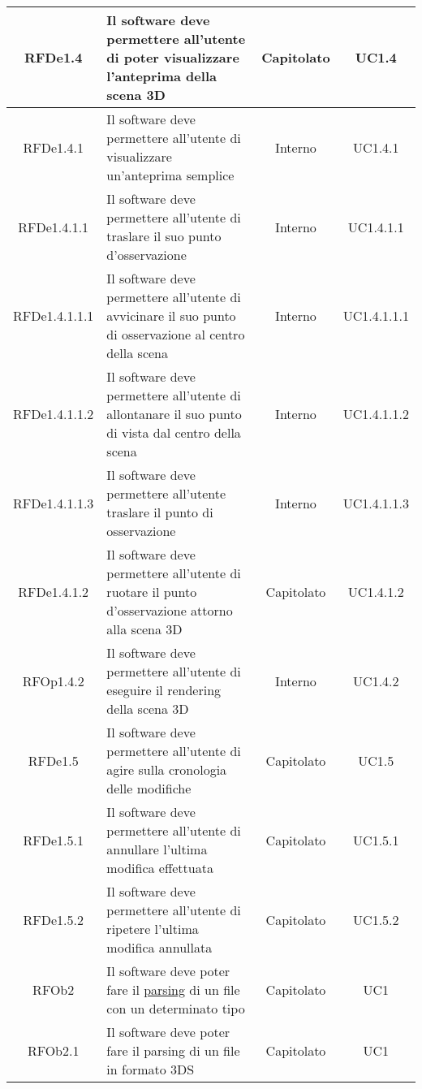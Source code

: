 \begin{longtable}{|c|p{6cm}|c|c|}
\midrule
RFDe1.4
& Il software deve permettere all'utente di poter visualizzare l'anteprima della scena 3D
& Capitolato
& UC1.4
\\


\midrule
RFDe1.4.1
& Il software deve permettere all'utente di visualizzare un'anteprima semplice
& Interno
& UC1.4.1
\\


\midrule
RFDe1.4.1.1
& Il software deve permettere all'utente di traslare il suo punto d'osservazione
& Interno
& UC1.4.1.1
\\


\midrule
RFDe1.4.1.1.1
& Il software deve permettere all'utente di avvicinare il suo punto di osservazione al centro della scena
& Interno
& UC1.4.1.1.1
\\


\midrule
RFDe1.4.1.1.2
& Il software deve permettere all'utente di allontanare il suo punto di vista dal centro della scena
& Interno
& UC1.4.1.1.2
\\


\midrule
RFDe1.4.1.1.3
& Il software deve permettere all'utente traslare il punto di osservazione
& Interno
& UC1.4.1.1.3
\\


\midrule
RFDe1.4.1.2
& Il software deve permettere all'utente di ruotare il punto d'osservazione attorno alla scena 3D
& Capitolato
& UC1.4.1.2
\\


\midrule
RFOp1.4.2
& Il software deve permettere all'utente di eseguire il rendering della scena 3D
& Interno
& UC1.4.2
\\


\midrule
RFDe1.5
& Il software deve permettere all'utente di agire sulla cronologia delle modifiche
& Capitolato
& UC1.5
\\


\midrule
RFDe1.5.1
& Il software deve permettere all'utente di annullare l'ultima modifica effettuata
& Capitolato
& UC1.5.1
\\


\midrule
RFDe1.5.2
& Il software deve permettere all'utente di ripetere l'ultima modifica annullata
& Capitolato
& UC1.5.2
\\


\midrule
RFOb2
& Il software deve poter fare il \underline{parsing} di un file con un determinato tipo
& Capitolato
& UC1
\\


\midrule
RFOb2.1
& Il software deve poter fare il parsing di un file in formato 3DS
& Capitolato
& UC1
\\



\end{longtable}
